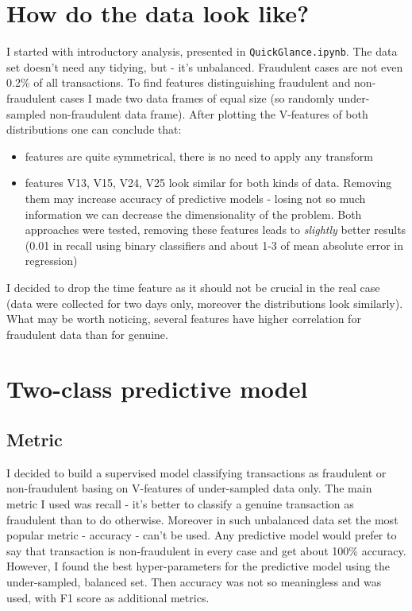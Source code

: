 \documentclass[11pt, a4paper, notitlepage]{article}
\begin{document}
\section{How do the data look like?}
I started with introductory analysis, presented in \verb|QuickGlance.ipynb|. The data set doesn't need any tidying, but - it's unbalanced. Fraudulent cases are not even 0.2\% of all transactions. To find features distinguishing fraudulent and non-fraudulent cases I made two data frames of equal size (so randomly under-sampled non-fraudulent data frame). After plotting the V-features of both distributions one can conclude that:
\begin{itemize}
\item features are quite symmetrical, there is no need to apply any transform  
\item features V13, V15, V24, V25 look similar for both kinds of data. Removing them may increase accuracy of predictive models - losing not so much information we can decrease the dimensionality of the problem. Both approaches were tested, removing these features leads to \textit{slightly} better results (0.01 in recall using binary classifiers and about 1-3 of mean absolute error in regression)
\end{itemize}
I decided to drop the time feature as it should not be crucial in the real case (data were collected for two days only, moreover the distributions look similarly).
What may be worth noticing, several features have higher correlation for fraudulent data than for genuine.

\section{Two-class predictive model}
\subsection{Metric}
I decided to build a supervised model classifying transactions as fraudulent or non-fraudulent basing on V-features of under-sampled data only. The main metric I used was recall - it's better to classify a genuine transaction as fraudulent than to do otherwise. Moreover in such unbalanced data set the most popular metric - accuracy - can't be used. Any predictive model would prefer to say that transaction is non-fraudulent in every case and get about 100\% accuracy.
However, I found the best hyper-parameters for the predictive model using the under-sampled, balanced set. Then accuracy was not so meaningless and was used, with F1 score as additional metrics.
\end{document}
